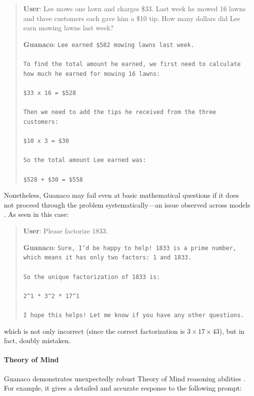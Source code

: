 \begin{quote}
    \textbf{User}: Lee mows one lawn and charges \$33. Last week he mowed 16 lawns and three customers each gave him a \$10 tip. How many dollars did Lee earn mowing lawns last week?

    \textbf{Guanaco}: \texttt{Lee earned \$582 mowing lawns last week. \\ \\ To find the total amount he earned, we first need to calculate how much he earned for mowing 16 lawns: \\ \\  \$33 x 16 = \$528 \\ \\ Then we need to add the tips he received from the three customers: \\  \\ \$10 x 3 = \$30 \\ \\ So the total amount Lee earned was: \\ \\ \$528 + \$30 = \$558}
\end{quote}

Nonetheless, {Guanaco} may fail even at basic mathematical questions if it does not proceed through the problem systematically—an issue observed across models \cite{weichain}. As seen in this case:

\begin{quote}
    \textbf{User}: Please factorize 1833.

    \textbf{Guanaco}: \texttt{Sure, I'd be happy to help! 1833 is a prime number, which means it has only two factors: 1 and 1833. \\ \\ So the unique factorization of 1833 is: \\ \\ 2\^{}1 * 3\^{}2 * 17\^{}1 \\ \\ I hope this helps! Let me know if you have any other questions.}
\end{quote}

which is not only incorrect (since the correct factorization is $3 \times 17 \times 43$), but in fact, doubly mistaken.

\paragraph{Theory of Mind} {Guanaco} demonstrates unexpectedly robust Theory of Mind reasoning abilities \cite{nematzadeh2018evaluating, sap2022neural}. For example, it gives a detailed and accurate response to the following prompt:

